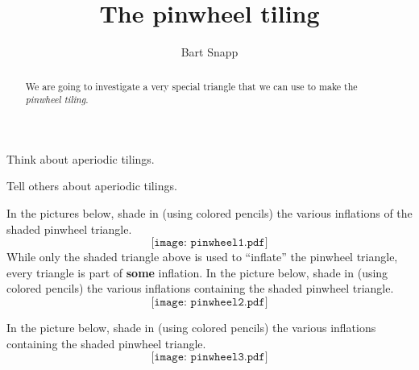 \documentclass[noauthor,nooutcomes,handout,hints,12pt]{ximera}
\title{The pinwheel tiling}
\author{Bart Snapp}
\begin{document}
\begin{abstract}
   We are going to investigate a very special triangle that we can use
   to make the \textit{pinwheel tiling}.
\end{abstract}
\maketitle

\begin{listOutcomes}
\item Think about aperiodic tilings.
\item Tell others about aperiodic tilings.
\end{listOutcomes}


\mynewpage

\begin{question}
In the pictures below, shade in (using colored pencils) the various
inflations of the shaded pinwheel triangle.
\[
\texttt{[image: pinwheel1.pdf]}
\]
While only the shaded triangle above is used to ``inflate'' the
pinwheel triangle, every triangle is part of \textbf{some}
inflation. In the picture below, shade in (using colored pencils) the
various inflations containing the shaded pinwheel triangle.
\[
\texttt{[image: pinwheel2.pdf]}
\]
\end{question}


\break

\begin{question}
In the picture below, shade in (using colored pencils) the
various inflations containing the shaded pinwheel triangle.
\[
\texttt{[image: pinwheel3.pdf]}
\]
\end{question}
\end{document}
